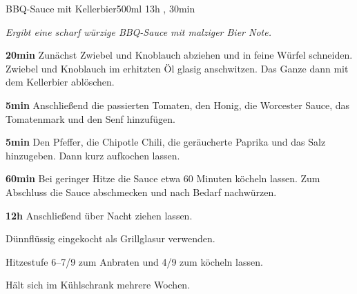 \documentclass[../recipe-collections/cooking.tex]{subfiles}
\begin{document}
\begin{recipe}{BBQ-Sauce mit Kellerbier}{500ml }{13h , 30min }

  \freeform{}\textit{Ergibt eine scharf würzige BBQ-Sauce mit malziger Bier Note.}


  \textbf{20min}
  Zunächst Zwiebel und Knoblauch abziehen und in feine Würfel schneiden.
  Zwiebel und Knoblauch im erhitzten Öl glasig anschwitzen.
  Das Ganze dann mit dem Kellerbier ablöschen.


  \textbf{5min}
  Anschließend die passierten Tomaten, den Honig, die Worcester Sauce, das Tomatenmark und den Senf hinzufügen.


  \textbf{5min}
  Den Pfeffer, die Chipotle Chili, die geräucherte Paprika und das Salz hinzugeben.
  Dann kurz aufkochen lassen.

  \newstep{}\textbf{60min}
  Bei geringer Hitze die Sauce etwa 60 Minuten köcheln lassen.
  Zum Abschluss die Sauce abschmecken und nach Bedarf nachwürzen.

  \newstep{}\textbf{12h}
  Anschließend über Nacht ziehen lassen.

  \freeform{}\hrulefill{}

  \freeform{}
  Dünnflüssig eingekocht als Grillglasur verwenden.

  \freeform{}
  Hitzestufe 6–7/9 zum Anbraten und 4/9 zum köcheln lassen.

  \freeform{}
  Hält sich im Kühlschrank mehrere Wochen.

\end{recipe}
\end{document}
